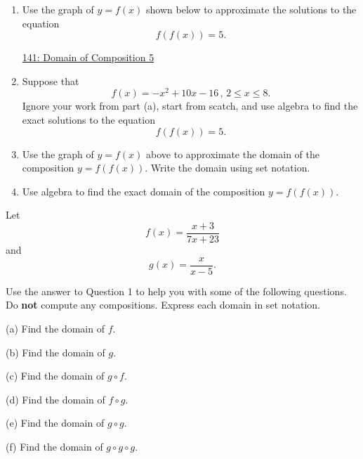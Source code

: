 \documentclass{ximera}
\begin{document}
\begin{example}  \label{Eerg4t4r5}
\begin{enumerate}

\item Use the graph of $y=f(x)$ shown below to approximate the solutions to the equation
\[
    f(f(x)) = 5 .
\]

\begin{onlineOnly}
    \begin{center}
\end{center}
\end{onlineOnly}

\href{https://www.desmos.com/calculator/ebd4bqyiqr}{141: Domain of Composition 5}

\item Suppose that 
\[
       f(x) = -x^2 +10x - 16 \, , \, 2\leq x \leq 8 .
\]
Ignore your work from part (a), start from scatch, and use algebra to find the exact solutions to the equation 
\[
    f(f(x)) = 5.
\]

\item Use the graph of $y=f(x)$ above to approximate the domain of the composition $y=f(f(x))$. Write the domain using set notation.

\item Use algebra to find the exact domain of the composition $y=f(f(x))$.



\end{enumerate}

\end{example}


\begin{example} \label{Ex1:Comp}
Let 
\[
     f(x) = \frac{x+3}{7x+23}
\]
and
\[
    g(x) = \frac{x}{x-5} .
\]

Use the answer to Question 1 to help you with some of the following questions. Do {\bf not} compute any compositions. Express each domain in set notation.
 
(a) Find the domain of $f$.

(b) Find the domain of $g$.

(c) Find the domain of $g\circ f$.

(d) Find the domain of $f\circ g$.

(e) Find the domain of $g\circ g$.

(f) Find the domain of $g\circ g\circ g$.

\end{example}
\end{document}
